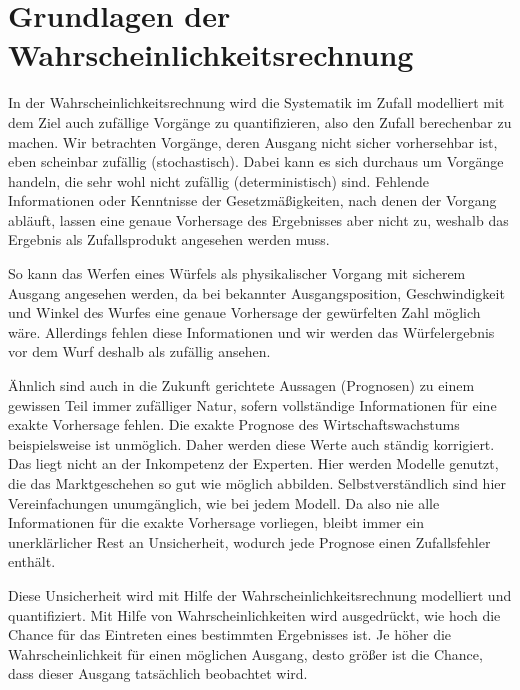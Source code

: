 \section{Grundlagen der Wahrscheinlichkeitsrechnung}

In der Wahrscheinlichkeitsrechnung wird die Systematik im Zufall modelliert mit dem Ziel auch zufällige Vorgänge zu quantifizieren, also den Zufall berechenbar zu machen. Wir betrachten Vorgänge, deren Ausgang nicht sicher vorhersehbar ist, eben scheinbar zufällig (stochastisch). Dabei kann es sich durchaus um Vorgänge handeln, die sehr wohl nicht zufällig (deterministisch) sind. Fehlende Informationen oder Kenntnisse der Gesetzmäßigkeiten, nach denen der Vorgang abläuft, lassen eine genaue Vorhersage des Ergebnisses aber nicht zu, weshalb das Ergebnis als Zufallsprodukt angesehen werden muss.

So kann das Werfen eines Würfels als physikalischer Vorgang mit sicherem Ausgang angesehen werden, da bei bekannter Ausgangsposition, Geschwindigkeit und Winkel des Wurfes eine genaue Vorhersage der gewürfelten Zahl möglich wäre. Allerdings fehlen diese Informationen und wir werden das Würfelergebnis vor dem Wurf deshalb als zufällig ansehen. 

Ähnlich sind auch in die Zukunft gerichtete Aussagen (Prognosen) zu einem gewissen Teil immer zufälliger Natur, sofern vollständige Informationen für eine exakte Vorhersage fehlen. Die exakte Prognose des Wirtschaftswachstums beispielsweise ist unmöglich. Daher werden diese Werte auch ständig korrigiert. Das liegt nicht an der Inkompetenz der Experten. Hier werden Modelle genutzt, die das Marktgeschehen so gut wie möglich abbilden. Selbstverständlich sind hier Vereinfachungen unumgänglich, wie bei jedem Modell. Da also nie alle Informationen für die exakte Vorhersage vorliegen, bleibt immer ein unerklärlicher Rest an Unsicherheit, wodurch jede Prognose einen Zufallsfehler enthält.

Diese Unsicherheit wird mit Hilfe der Wahrscheinlichkeitsrechnung modelliert und quantifiziert. Mit Hilfe von Wahrscheinlichkeiten wird ausgedrückt, wie hoch die Chance für das Eintreten eines bestimmten Ergebnisses ist. Je höher  die Wahrscheinlichkeit für einen möglichen Ausgang, desto größer ist die Chance, dass dieser Ausgang tatsächlich beobachtet wird.
 
